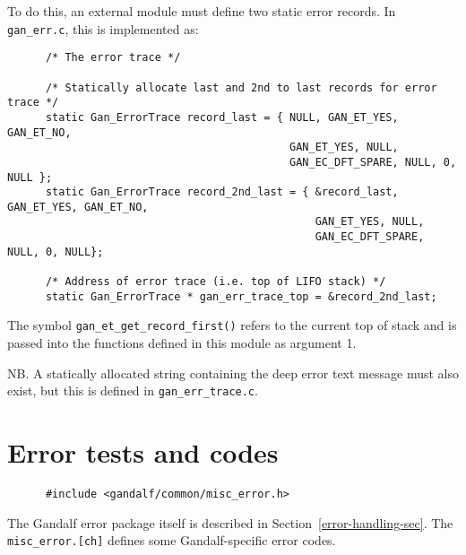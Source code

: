 To do this, an external module must define two static
error records. In {\tt gan\_err.c}, this is implemented as:
\begin{verbatim}
      /* The error trace */

      /* Statically allocate last and 2nd to last records for error trace */
      static Gan_ErrorTrace record_last = { NULL, GAN_ET_YES, GAN_ET_NO,
                                            GAN_ET_YES, NULL,
                                            GAN_EC_DFT_SPARE, NULL, 0, NULL };
      static Gan_ErrorTrace record_2nd_last = { &record_last, GAN_ET_YES, GAN_ET_NO,
                                                GAN_ET_YES, NULL,
                                                GAN_EC_DFT_SPARE, NULL, 0, NULL};

      /* Address of error trace (i.e. top of LIFO stack) */
      static Gan_ErrorTrace * gan_err_trace_top = &record_2nd_last;
\end{verbatim}
The symbol {\tt gan\_et\_get\_record\_first()} refers to the current top
of stack and is passed into the functions defined in this module as argument 1.

NB. A statically allocated string containing the deep error text message must
also exist, but this is defined in {\tt gan\_err\_trace.c}.

\section{Error tests and codes} \label{error-sec}
\begin{verbatim}
      #include <gandalf/common/misc_error.h>
\end{verbatim}
The Gandalf error package itself is described in
Section~\ref{error-handling-sec}.  The {\tt misc\_error.[ch]}
defines some Gandalf-specific error codes.
